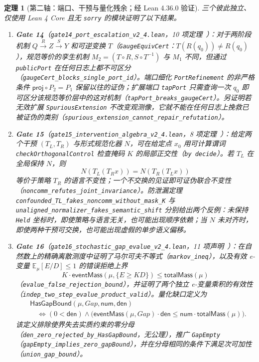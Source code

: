 \documentclass[11pt,a4paper,UTF8,fontset=fandol]{ctexart}
\newtheorem{theorem}{定理}[section]
\DeclareRobustCommand{\id}[1]{\nolinkurl{#1}}
\newcommand{\Gap}{\mathit{Gap}}
\begin{document}
\begin{theorem}[第二轴：端口、干预与量化残余；经 Lean 4.36.0 验证]
三个彼此独立、仅使用 Lean 4 Core 且无 \id{sorry} 的模块证明了以下结果。
\begin{enumerate}
\item \textbf{Gate 14}（\id{gate14_port_escalation_v2_4.lean}，10 项定理~\cite{g14}）：对于两阶段机制 $Q\xrightarrow{R} Z\xrightarrow{S}Y$ 和可逆变换 $T$（\id{GaugeEquivCert}：$T(R(q_0))\ne R(q_0)$），规范等价的孪生机制 $M_2=(T\circ R,S\circ T^{-1})$ 与 $M_1$ 不同，但通过 \id{publicPort} 在任何日志上都不可区分（\id{gaugeCert_blocks_single_port_id}）。端口细化 \id{PortRefinement} 的非严格条件 $\mathsf{proj}\circ P_2=P_1$ 保留以往的证伪；扩展端口 \id{tapPort} 只需查询一次 $q_0$ 即可区分该规范等价层中的这对机制（\id{tapPort_breaks_gaugeCert}）。另证明若无效扩展 \id{SpuriousExtension} 不改变观测像，它就不能在任何日志上挽救已被证伪的类别（\id{spurious_extension_cannot_repair_refutation}）。
\item \textbf{Gate 15}（\id{gate15_intervention_algebra_v2_4.lean}，8 项定理~\cite{g15}）：给定两个干预 $(T_L,T_R)$ 与形式规范化器 $N$，可在给定点 $x_0$ 用可计算谓词 \id{checkOrthogonalControl} 检查掩码 $K$ 的局部正交性（\id{by decide}）。若 $T_L$ 在全局保持 $N$，则
\[
  N(T_L(T_R x))=N(T_R(T_L x))
\]
等价于策略 $T_R$ 的语言不变性；一个不交换的见证即可证伪联合不变性（\id{noncomm_refutes_joint_invariance}）。防泄漏定理 \id{confounded_TL_fakes_noncomm_without_mask_K} 与 \id{unaligned_normalizer_fakes_semantic_shift} 分别给出两个反例：未保持 \id{Held} 坐标时，即使策略与语言无关，也可能出现顺序依赖；当 $N$ 未对齐时，即使两种干预可交换，也可能出现虚假的单步语义偏移。
\item \textbf{Gate 16}（\id{gate16_stochastic_gap_evalue_v2_4.lean}，11 项声明~\cite{g16}）：在自然数上的精确离散测度中证明了马尔可夫不等式（\id{markov_ineq}），以及有效 e-变量 $\mathbb E_\mu[E/D]\le1$ 的错误拒绝上界
\[
 K\cdot\mathsf{eventMass}(\mu,\{E\ge KD\})\le\mathsf{totalMass}(\mu)
\]
（\id{evalue_false_rejection_bound}），并证明了两个独立 e-变量乘积的有效性（\id{indep_two_step_evalue_product_valid}）。量化缺口定义为
\begin{align*}
&\mathsf{HasGapBound}(\mu,\Gap,\mathsf{num},\mathsf{den})\\
&\quad\Longleftrightarrow (0<\mathsf{den})\land
\bigl(\mathsf{eventMass}(\mu,\Gap)\cdot\mathsf{den}
\le\mathsf{num}\cdot\mathsf{totalMass}(\mu)\bigr).
\end{align*}
该定义排除使界失去实质约束的零分母（\id{den_zero_rejected_by_HasGapBound}，无公理），推广 \id{GapEmpty}（\id{gapEmpty_implies_zero_gapBound}），并在分母相同的条件下满足次可加性（\id{union_gap_bound}）。
\end{enumerate}
\end{theorem}
\end{document}
